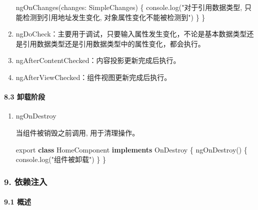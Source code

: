 \documentclass[
]{article}
\newenvironment{Shaded}{}{}
\newcommand{\BuiltInTok}[1]{#1}
\newcommand{\DataTypeTok}[1]{\textcolor[rgb]{0.56,0.13,0.00}{#1}}
\newcommand{\FunctionTok}[1]{\textcolor[rgb]{0.02,0.16,0.49}{#1}}
\newcommand{\ImportTok}[1]{#1}
\newcommand{\KeywordTok}[1]{\textcolor[rgb]{0.00,0.44,0.13}{\textbf{#1}}}
\newcommand{\NormalTok}[1]{#1}
\newcommand{\OperatorTok}[1]{\textcolor[rgb]{0.40,0.40,0.40}{#1}}
\newcommand{\StringTok}[1]{\textcolor[rgb]{0.25,0.44,0.63}{#1}}
\begin{document}
\begin{enumerate}
\begin{Shaded}
\begin{Highlighting}[]
  \FunctionTok{ngOnChanges}\NormalTok{(}\DataTypeTok{changes}\OperatorTok{:}\NormalTok{ SimpleChanges) \{}
    \BuiltInTok{console}\OperatorTok{.}\FunctionTok{log}\NormalTok{(}\StringTok{"对于引用数据类型, 只能检测到引用地址发生变化, 对象属性变化不能被检测到"}\NormalTok{)}
\NormalTok{  \}}
\NormalTok{\}}
\end{Highlighting}
\end{Shaded}
\item
  ngDoCheck：主要用于调试，只要输入属性发生变化，不论是基本数据类型还是引用数据类型还是引用数据类型中的属性变化，都会执行。
\item
  ngAfterContentChecked：内容投影更新完成后执行。
\item
  ngAfterViewChecked：组件视图更新完成后执行。
\end{enumerate}

\hypertarget{83-ux5378ux8f7dux9636ux6bb5}{%
\paragraph{8.3 卸载阶段}\label{83-ux5378ux8f7dux9636ux6bb5}}

\begin{enumerate}
\def\labelenumi{\arabic{enumi}.}
\item
  ngOnDestroy

  当组件被销毁之前调用, 用于清理操作。

\begin{Shaded}
\begin{Highlighting}[]
\ImportTok{export} \KeywordTok{class}\NormalTok{ HomeComponent }\KeywordTok{implements}\NormalTok{ OnDestroy \{}
  \FunctionTok{ngOnDestroy}\NormalTok{() \{}
    \BuiltInTok{console}\OperatorTok{.}\FunctionTok{log}\NormalTok{(}\StringTok{"组件被卸载"}\NormalTok{)}
\NormalTok{  \}}
\NormalTok{\}}
\end{Highlighting}
\end{Shaded}
\end{enumerate}

\hypertarget{9-ux4f9dux8d56ux6ce8ux5165}{%
\subsubsection{9. 依赖注入}\label{9-ux4f9dux8d56ux6ce8ux5165}}

\hypertarget{91-ux6982ux8ff0}{%
\paragraph{9.1 概述}\label{91-ux6982ux8ff0}}
\end{document}
